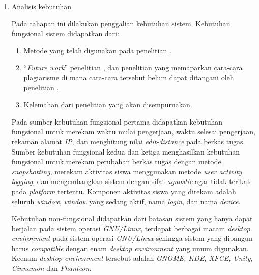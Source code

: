 \begin{enumerate}[
leftmargin=0pt, itemindent=20pt,
labelwidth=15pt, labelsep=5pt, listparindent=0.7cm,
align=left]

\item Analisis kebutuhan

  Pada tahapan ini dilakukan penggalian kebutuhan sistem. Kebutuhan fungsional
  sistem didapatkan dari:

  \begin{enumerate}
  \item Metode yang telah digunakan pada penelitian
    \parencite{hellas2017plagiarism}.
  \item ``\emph{Future work}'' penelitian \textcite{hellas2017plagiarism}, dan
    penelitian \textcite{leung2017instructional} yang memaparkan cara-cara
    plagiarisme di mana cara-cara tersebut belum dapat ditangani oleh penelitian
    \textcite{hellas2017plagiarism}.
  \item Kelemahan dari penelitian \textcite{hellas2017plagiarism} yang akan disempurnakan.
  \end{enumerate}

  Pada sumber kebutuhan fungsional pertama didapatkan kebutuhan fungsional untuk
  merekam waktu mulai pengerjaan, waktu selesai pengerjaan, rekaman alamat
  \emph{IP}, dan menghitung nilai \emph{edit-distance} pada berkas tugas.  Sumber
  kebutuhan fungsional kedua dan ketiga menghasilkan kebutuhan fungsional untuk
  merekam perubahan berkas tugas dengan metode \emph{snapshotting}, merekam
  aktivitas siswa menggunakan metode \emph{user activity logging}, dan
  mengembangkan sistem dengan sifat \emph{agnostic} agar tidak terikat pada
  \emph{platform} tertentu. Komponen aktivitas siswa yang direkam adalah seluruh
  \emph{window}, \emph{window} yang sedang aktif, nama \emph{login}, dan nama
  \emph{device}.

  Kebutuhan non-fungsional didapatkan dari batasan sistem yang hanya dapat
  berjalan pada sistem operasi \emph{GNU/Linux}, terdapat berbagai macam
  \emph{desktop environment} pada sistem operasi \emph{GNU/Linux} sehingga
  sistem yang dibangun harus \emph{compatible} dengan enam \emph{desktop
    environment} yang umum digunakan. Keenam \emph{desktop environment} tersebut
  adalah \emph{GNOME, KDE, XFCE, Unity, Cinnamon} dan \emph{Phanteon}.


\end{enumerate}
